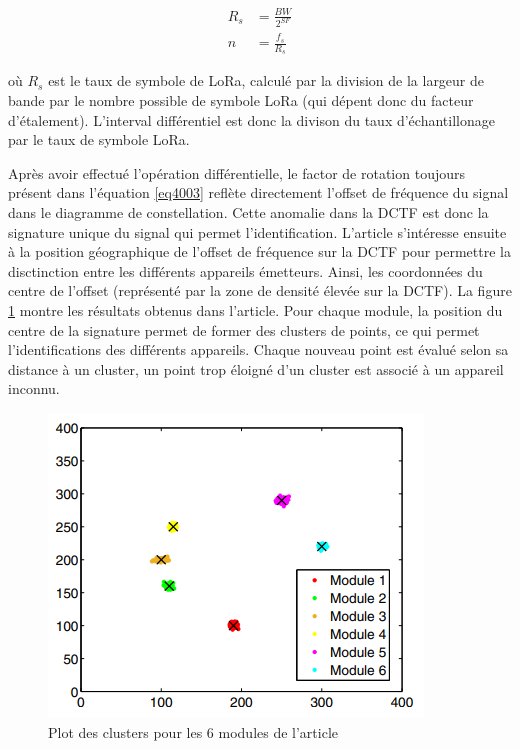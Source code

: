 \begin{align}\label{eq4006}
	R_s &= \frac{BW}{2^{SF}} \\
	n	&= \frac{f_s}{R_s}
\end{align}

où $R_s$ est le taux de symbole de LoRa, calculé par la division de la largeur de bande par le nombre possible de symbole LoRa (qui dépent donc du facteur d'étalement). L'interval différentiel est donc la divison du taux d'échantillonage par le taux de symbole LoRa.

\vspace{0.1cm}

Après avoir effectué l'opération différentielle, le factor de rotation toujours présent dans l'équation \ref{eq4003} reflète directement l'offset de fréquence du signal dans le diagramme de constellation. Cette anomalie dans la DCTF est donc la signature unique du signal qui permet l'identification. L'article s'intéresse ensuite à la position géographique de l'offset de fréquence sur la DCTF pour permettre la disctinction entre les différents appareils émetteurs. Ainsi, les coordonnées du centre de l'offset (représenté par la zone de densité élevée sur la DCTF). La figure \ref{term4000} montre les résultats obtenus dans l'article. Pour chaque module, la position du centre de la signature permet de former des clusters de points, ce qui permet l'identifications des différents appareils. Chaque nouveau point est évalué selon sa distance à un cluster, un point trop éloigné d'un cluster est associé à un appareil inconnu.


\begin{figure}[h]
\centering

\includegraphics[scale=0.8]{images/impossible.png}
\caption{Plot des clusters pour les 6 modules de l'article\cite{loraDCTF}}\label{term4000}
\end{figure}

